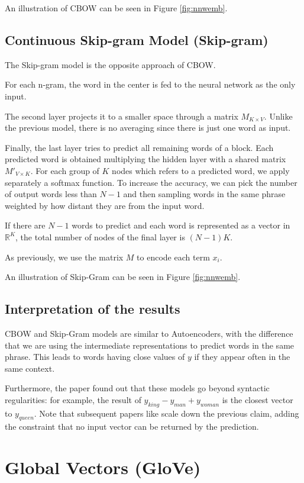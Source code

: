 An illustration of CBOW can be seen in Figure \ref{fig:nnwemb}.

\subsection{Continuous Skip-gram Model (Skip-gram)}
The Skip-gram model is the opposite approach of CBOW.

For each n-gram, the word in the center is fed to the neural network as the only input.

The second layer projects it to a smaller space through a matrix $M_{K \times V}$.
Unlike the previous model, there is no averaging since there is just one word as input.

Finally, the last layer tries to predict all remaining words of a block.
Each predicted word is obtained multiplying the hidden layer with a shared matrix $M'_{V \times K}$.
For each group of $K$ nodes which refers to a predicted word, we apply separately a softmax function.
To increase the accuracy, we can pick the number of output words less than $N-1$ and then sampling
words in the same phrase weighted by how distant they are from the input word.

If there are $N-1$ words to predict and each word is represented as a vector in $\mathbb{R}^K$,
the total number of nodes of the final layer is $(N-1)K$.

As previously, we use the matrix $M$ to encode each term $x_i$.

An illustration of Skip-Gram can be seen in Figure \ref{fig:nnwemb}.

\subsection{Interpretation of the results}
CBOW and Skip-Gram models are similar to Autoencoders,
with the difference that we are using the intermediate representations to predict words in the same phrase.
This leads to words having close values of $y$ if they appear often in the same context.

Furthermore, the paper \cite{DBLP:journals/corr/abs-1301-3781}
found out that these models go beyond syntactic regularities: for example,
the result of $y_{king} - y_{man} + y_{woman}$ is the closest vector to $y_{queen}$.
Note that subsequent papers like \cite{nissim2019fair} scale down the previous claim,
adding the constraint that no input vector can be returned by the prediction.

\section{Global Vectors (GloVe)}

